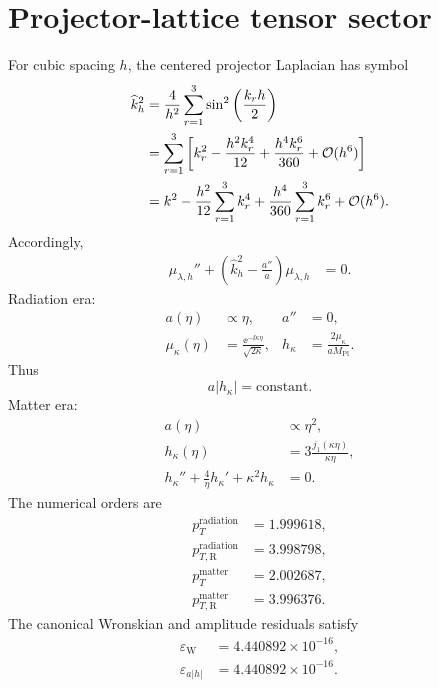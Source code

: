 \section{Projector-lattice tensor sector}
For cubic spacing \(h\), the centered projector Laplacian has symbol
\begin{align}
\widehat k_h^2
&=\frac4{h^2}\sum_{r=1}^3
\sin^2\left(\frac{k_rh}{2}\right)\\
&=\sum_{r=1}^3
\left[
k_r^2-\frac{h^2k_r^4}{12}
+\frac{h^4k_r^6}{360}
+\mathcal O(h^6)
\right]\\
&=k^2-\frac{h^2}{12}\sum_{r=1}^3k_r^4
+\frac{h^4}{360}\sum_{r=1}^3k_r^6
+\mathcal O(h^6).
\end{align}
Accordingly,
\begin{align}
\mu_{\lambda,h}''+
\left(\widehat k_h^2-\frac{a''}{a}\right)
\mu_{\lambda,h}&=0.
\end{align}
Radiation era:
\begin{align}
a(\eta)&\propto\eta,
&a''&=0,\\
\mu_\kappa(\eta)&=\frac{\ee^{-\ii\kappa\eta}}{\sqrt{2\kappa}},
&h_\kappa&=\frac{2\mu_\kappa}{aM_{\mathrm{Pl}}}.
\end{align}
Thus
\begin{equation}
a|h_\kappa|=\mathrm{constant}.
\end{equation}
Matter era:
\begin{align}
a(\eta)&\propto\eta^2,\\
h_\kappa(\eta)
&=3\frac{j_1(\kappa\eta)}{\kappa\eta},\\
h_\kappa''+\frac4\eta h_\kappa'+\kappa^2h_\kappa&=0.
\end{align}
The numerical orders are
\begin{align}
p_T^{\mathrm{radiation}}&=1.999618,\\
p_{T,\mathrm R}^{\mathrm{radiation}}&=3.998798,\\
p_T^{\mathrm{matter}}&=2.002687,\\
p_{T,\mathrm R}^{\mathrm{matter}}&=3.996376.
\end{align}
The canonical Wronskian and amplitude residuals satisfy
\begin{align}
\varepsilon_{\mathrm W}&=4.440892\times10^{-16},\\
\varepsilon_{a|h|}&=4.440892\times10^{-16}.
\end{align}

